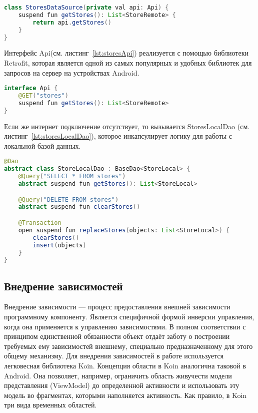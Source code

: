 \begin{lstlisting}[language=Java,label={lst:storesDataSource},caption={StoresDataSource}]
class StoresDataSource(private val api: Api) {
    suspend fun getStores(): List<StoreRemote> {
        return api.getStores()
    }
}
\end{lstlisting}

Интерфейс Api(см. листинг~\ref{lst:storesApi}) реализуется с помощью библиотеки Retrofit, которая является одной из самых популярных и удобных библиотек для запросов на сервер на устройствах Android.

\begin{lstlisting}[language=Java,label={lst:storesApi},caption={Api}]
interface Api {
    @GET("stores")
    suspend fun getStores(): List<StoreRemote>
}
\end{lstlisting}

Если же интернет подключение отсутствует, то вызывается StoresLocalDao (см. листинг~\ref{lst:storesLocalDao}), которое инкапсулирует логику для работы с локальной базой данных.
\begin{lstlisting}[language=Java,label={lst:storesLocalDao},caption={StoresLocalDao}]
@Dao
abstract class StoreLocalDao : BaseDao<StoreLocal> {
    @Query("SELECT * FROM stores")
    abstract suspend fun getStores(): List<StoreLocal>

    @Query("DELETE FROM stores")
    abstract suspend fun clearStores()

    @Transaction
    open suspend fun replaceStores(objects: List<StoreLocal>) {
        clearStores()
        insert(objects)
    }
}
\end{lstlisting}

\subsection{Внедрение зависимостей}
Внедрение зависимости — процесс предоставления внешней зависимости программному компоненту. Является специфичной формой инверсии управления, когда она применяется к управлению зависимостями. В полном соответствии с принципом единственной обязанности объект отдаёт заботу о построении требуемых ему зависимостей внешнему, специально предназначенному для этого общему механизму. Для внедрения зависимостей в работе используется легковесная библиотека Koin. Концепция области в Koin аналогична таковой в Android. Она позволяет, например, ограничить область живучести модели представления (ViewModel) до определенной активности и использовать эту модель во фрагментах, которыми наполняется активность. Как правило, в Koin три вида временных областей.

